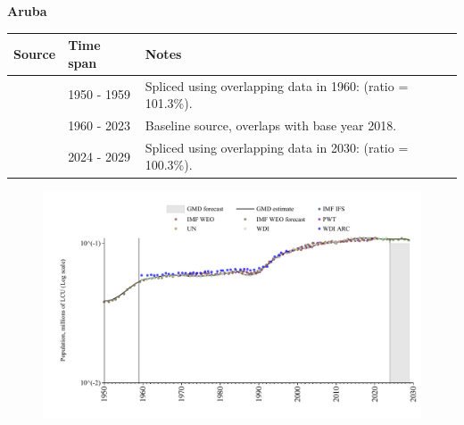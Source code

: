 \documentclass[12pt,a4paper,landscape]{article}
\begin{document}
\begin{adjustbox}{max totalsize={\paperwidth}{\paperheight},center}
\begin{minipage}[t][\textheight][t]{\textwidth}
\vspace*{0.5cm}
{}
\begin{center}
{\Large\bfseries Aruba}
\end{center}
\vspace{0.5cm}
\begin{table}[H]
\centering
\small
\begin{tabular}{|l|l|l|}
\hline
\textbf{Source} & \textbf{Time span} & \textbf{Notes} \\
\hline
\rowcolor{white}\cite{IMF_IFS}& 1950 - 1959 &Spliced using overlapping data in 1960: (ratio = 101.3\%).\\
\rowcolor{lightgray}\cite{WDI}& 1960 - 2023 &Baseline source, overlaps with base year 2018.\\
\rowcolor{white}\cite{IMF_WEO_forecast}& 2024 - 2029 &Spliced using overlapping data in 2030: (ratio = 100.3\%).\\
\hline
\end{tabular}
\end{table}
\begin{figure}[H]
\centering
\includegraphics[width=\textwidth,height=0.6\textheight,keepaspectratio]{graphs/ABW_pop.pdf}
\end{figure}
\end{minipage}
\end{adjustbox}
\end{document}
